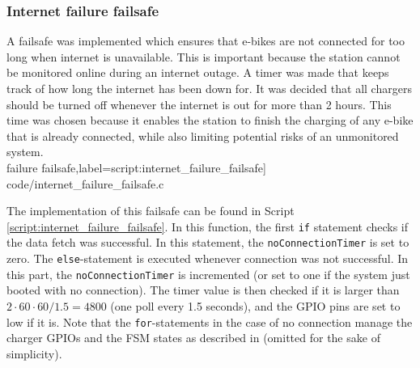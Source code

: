 \subsubsection{Internet failure failsafe}
A failsafe was implemented which ensures that e-bikes are not connected for too long when internet is unavailable. This is important because the station cannot be monitored online during an internet outage. A timer was made that keeps track of how long the internet has been down for. It was decided that all chargers should be turned off whenever the internet is out for more than 2 hours. This time was chosen because it enables the station to finish the charging of any e-bike that is already connected, while also limiting potential risks of an unmonitored system.\\

\scriptsize
	 failure failsafe,label=script:internet_failure_failsafe] {code/internet_failure_failsafe.c}
\normalsize

The implementation of this failsafe can be found in Script \ref{script:internet_failure_failsafe}. In this function, the first \verb|if| statement checks if the data fetch was successful. In this statement, the \verb|noConnectionTimer| is set to zero. The \verb|else|-statement is executed whenever connection was not successful. In this part, the \verb|noConnectionTimer| is incremented (or set to one if the system just booted with no connection). The timer value is then checked if it is larger than $2\cdot60\cdot60/1.5=4800$ (one poll every 1.5 seconds), and the GPIO pins are set to low if it is. Note that the \verb|for|-statements in the case of no connection manage the charger GPIOs and the FSM states as described in  (omitted for the sake of simplicity).